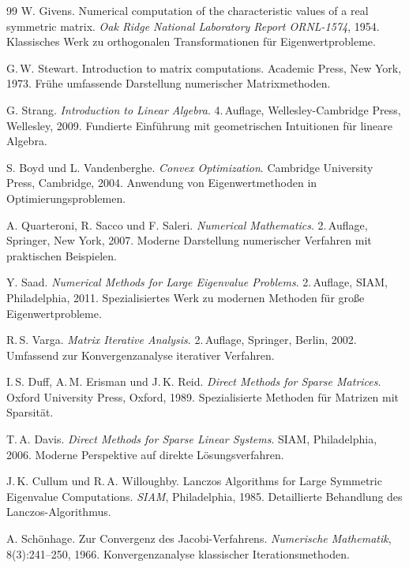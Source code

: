 \documentclass[a4paper,12pt]{article}
\theoremstyle{definition}
\begin{document}
\begin{thebibliography}{99}
W. Givens. Numerical computation of the characteristic values of a real symmetric matrix. \textit{Oak Ridge National Laboratory Report ORNL-1574}, 1954.
\newblock Klassisches Werk zu orthogonalen Transformationen für Eigenwertprobleme.

G.\,W. Stewart. Introduction to matrix computations. Academic Press, New York, 1973.
\newblock Frühe umfassende Darstellung numerischer Matrixmethoden.

G. Strang. \textit{Introduction to Linear Algebra}. 4.\,Auflage, Wellesley-Cambridge Press, Wellesley, 2009.
\newblock Fundierte Einführung mit geometrischen Intuitionen für lineare Algebra.

S. Boyd und L. Vandenberghe. \textit{Convex Optimization}. Cambridge University Press, Cambridge, 2004.
\newblock Anwendung von Eigenwertmethoden in Optimierungsproblemen.

A. Quarteroni, R. Sacco und F. Saleri. \textit{Numerical Mathematics}. 2.\,Auflage, Springer, New York, 2007.
\newblock Moderne Darstellung numerischer Verfahren mit praktischen Beispielen.

Y. Saad. \textit{Numerical Methods for Large Eigenvalue Problems}. 2.\,Auflage, SIAM, Philadelphia, 2011.
\newblock Spezialisiertes Werk zu modernen Methoden für große Eigenwertprobleme.

R.\,S. Varga. \textit{Matrix Iterative Analysis}. 2.\,Auflage, Springer, Berlin, 2002.
\newblock Umfassend zur Konvergenzanalyse iterativer Verfahren.

I.\,S. Duff, A.\,M. Erisman und J.\,K. Reid. \textit{Direct Methods for Sparse Matrices}. Oxford University Press, Oxford, 1989.
\newblock Spezialisierte Methoden für Matrizen mit Sparsität.

T.\,A. Davis. \textit{Direct Methods for Sparse Linear Systems}. SIAM, Philadelphia, 2006.
\newblock Moderne Perspektive auf direkte Lösungsverfahren.

J.\,K. Cullum und R.\,A. Willoughby. Lanczos Algorithms for Large Symmetric Eigenvalue Computations. \textit{SIAM}, Philadelphia, 1985.
\newblock Detaillierte Behandlung des Lanczos-Algorithmus.

A. Schönhage. Zur Convergenz des Jacobi-Verfahrens. \textit{Numerische Mathematik}, 8(3):241--250, 1966.
\newblock Konvergenzanalyse klassischer Iterationsmethoden.


\end{thebibliography}
\end{document}
